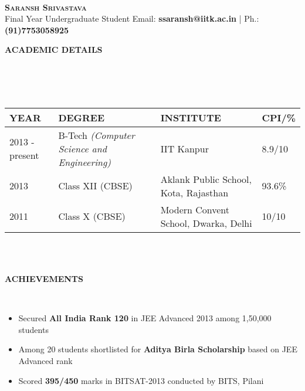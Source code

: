 \documentclass[a4paper,10pt]{article}
\newcommand{\isep}{-2 pt}
\newcommand{\lsep}{-0.5cm}
\newcommand{\resheading}[1]{{\small \colorbox{mygrey}{\begin{minipage}{0.975\textwidth}{\textbf{#1 \vphantom{p\^{E}}}}\end{minipage}}}}
\begin{document}
\hspace{0.5cm}\\[-0.2cm]

\textbf{\Huge \textsc{Saransh Srivastava}}\\
\indent Final Year Undergraduate Student\hfill
Email: \textbf{ssaransh@iitk.ac.in} |
Ph.: \textbf{(91)7753058925} \\

\resheading{\textbf{ACADEMIC DETAILS} }\\[\lsep]
\\ \\
\indent \begin{tabular}{ L{3cm} L{7cm} L{8cm} L{1.2cm} }
\hline
\textbf{YEAR} & \textbf{DEGREE} & \textbf{INSTITUTE}  & \textbf{CPI/\%} \\
\hline

2013 - present & B-Tech \emph{(Computer Science and Engineering)} & IIT Kanpur & 8.9/10 \\
2013 & Class XII (CBSE) & Aklank Public School, Kota, Rajasthan  & 93.6\% \\
2011 & Class X (CBSE) & Modern Convent School, Dwarka, Delhi & 10/10 \\
\hline
\end{tabular}
\\ \\


\resheading{\textbf{ACHIEVEMENTS} }\\[\lsep]
\begin{itemize}\itemsep \isep
\item \noindent Secured \textbf{All India Rank 120} in JEE Advanced 2013 among 1,50,000 students
\item \noindent Among 20 students shortlisted for \textbf{Aditya Birla Scholarship} based on JEE Advanced rank
\item \noindent Scored \textbf{395/450} marks in BITSAT-2013 conducted by BITS, Pilani
\end{itemize}
\end{document}
